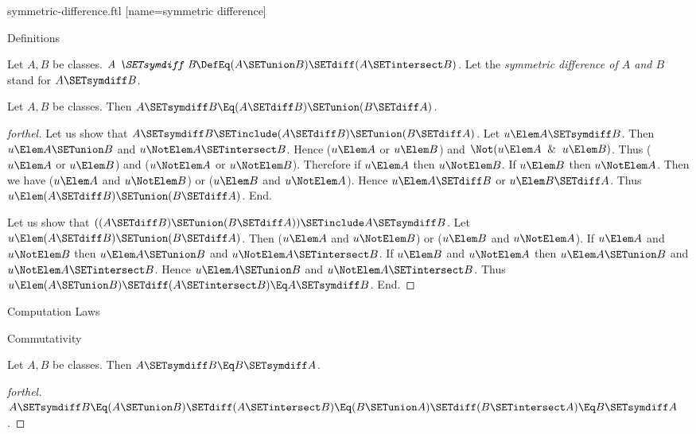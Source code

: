 \documentclass{stex}
\begin{document}
\begin{smodule}{symmetric-difference.ftl}
[name=symmetric difference]{\,\triangle\,}

\begin{sfragment}{Definitions}
  \begin{definition}[forthel,for=symmetric difference]
    Let $A, B$ be classes.
    $\emph{A \SETsymdiff B} \DefEq (A \SETunion B) \SETdiff (A \SETintersect B)$.
    Let the \emph{symmetric difference of $A$ and $B$} stand for $A \SETsymdiff B$.
  \end{definition}

  \begin{proposition}[forthel]
    Let $A, B$ be classes.
    Then $A \SETsymdiff B \Eq (A \SETdiff B) \SETunion (B \SETdiff A)$.
  \end{proposition}
  \begin{proof}[forthel]
    Let us show that $A \SETsymdiff B \SETinclude (A \SETdiff B) \SETunion (B \SETdiff A)$.
      Let $u \Elem A \SETsymdiff B$.
      Then $u \Elem A \SETunion B$ and $u \NotElem A \SETintersect B$.
      Hence ($u \Elem A$ or $u \Elem B$) and $\Not(u \Elem A \And u \Elem B)$.
      Thus ($u \Elem A$ or $u \Elem B$) and ($u \NotElem A$ or $u \NotElem B$).
      Therefore if $u \Elem A$ then $u \NotElem B$.
      If $u \Elem B$ then $u \NotElem A$.
      Then we have ($u \Elem A$ and $u \NotElem B$) or ($u \Elem B$ and $u \NotElem A$).
      Hence $u \Elem A \SETdiff B$ or $u \Elem B \SETdiff A$.
      Thus $u \Elem (A \SETdiff B) \SETunion (B \SETdiff A)$.
    End.

    Let us show that $((A \SETdiff B) \SETunion (B \SETdiff A)) \SETinclude A \SETsymdiff B$. %
      Let $u \Elem (A \SETdiff B) \SETunion (B \SETdiff A)$.
      Then ($u \Elem A$ and $u \NotElem B$) or ($u \Elem B$ and $u \NotElem A$).
      If $u \Elem A$ and $u \NotElem B$ then $u \Elem A \SETunion B$ and $u \NotElem A \SETintersect B$.
      If $u \Elem B$ and $u \NotElem A$ then $u \Elem A \SETunion B$ and $u \NotElem A \SETintersect B$.
      Hence $u \Elem A \SETunion B$ and $u \NotElem A \SETintersect B$.
      Thus $u \Elem (A \SETunion B) \SETdiff (A \SETintersect B) \Eq A \SETsymdiff B$.
    End.
  \end{proof}
\end{sfragment}

\begin{sfragment}{Computation Laws}
  \begin{sfragment}{Commutativity}
    \begin{proposition}[forthel]
      Let $A, B$ be classes.
      Then $A \SETsymdiff B \Eq B \SETsymdiff A$.
    \end{proposition}
    \begin{proof}[forthel]
      $A \SETsymdiff B
        \Eq (A \SETunion B) \SETdiff (A \SETintersect B)
        \Eq (B \SETunion A) \SETdiff (B \SETintersect A)
        \Eq B \SETsymdiff A$.
    \end{proof}
  \end{sfragment}


\end{sfragment}
\end{smodule}
\end{document}
